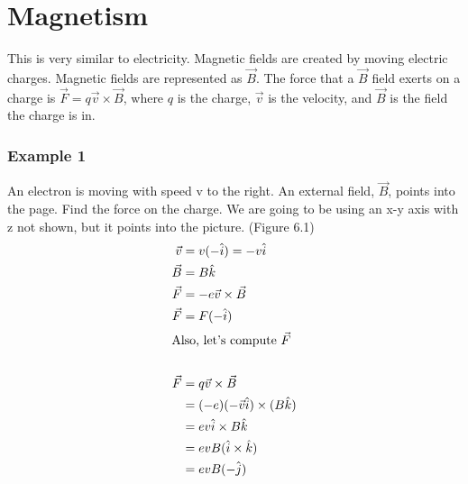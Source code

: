 \section{Magnetism}
    This is very similar to electricity. Magnetic fields are created by moving electric charges. Magnetic fields are represented as $\vec{B}$. The force that a $\vec{B}$ field exerts on a charge is $\vec{F}=q\vec{v}\times\vec{B}$, where $q$ is the charge, $\vec{v}$ is the velocity, and $\vec{B}$ is the field the charge is in.
    \subsubsection{Example 1}
    An electron is moving with speed v to the right. An external field, $\vec{B}$, points into the page. Find the force on the charge. We are going to be using an x-y axis with z not shown, but it points into the picture. (Figure 6.1)
    \begin{align*}
        \vec{v}&=v(-\hat{i})=-v\hat{i}\\
        \vec{B}&=B\hat{k}\\
        \vec{F}&=-e\vec{v}\times\vec{B}\\
        \vec{F}&=F(-\hat{i})\\
        \shortintertext{Also, let's compute $\vec{F}$}\\
        \vec{F}&=q\vec{v}\times\vec{B}\\
        &=(-e)(-\vec{v}\hat{i})\times(B\hat{k})\\
        &= ev\hat{i}\times B\hat{k}\\
        &=evB(\hat{i}\times\hat{k})\\
        &=evB(-\hat{j})\\
    \end{align*}
